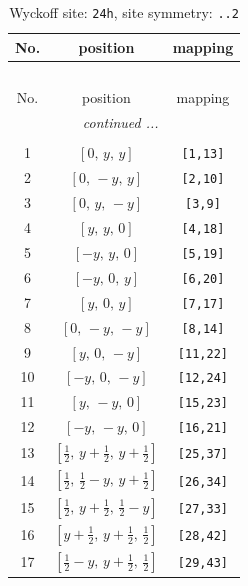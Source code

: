 \documentclass[fleqn,8pt]{jsarticle}
\begin{document}
\begin{longtable}{ccc}
\caption{Wyckoff site: {\tt 24h}, site symmetry: {\tt ..2}}
 \\
 \hline \hline
No. & position & mapping \\ \hline \endfirsthead

\multicolumn{2}{l}{\tablename\ \thetable{}} \\
 \hline \hline
No. & position & mapping \\ \hline \endhead

 \hline \hline
\multicolumn{2}{r}{\footnotesize\it continued ...} \\ \endfoot

 \hline \hline
\multicolumn{2}{r}{} \\ \endlastfoot

1 & $\left[ 0,\, y,\, y \right]$ & {\tt [1,13]} \\ \hline
2 & $\left[ 0,\, - y,\, y \right]$ & {\tt [2,10]} \\ \hline
3 & $\left[ 0,\, y,\, - y \right]$ & {\tt [3,9]} \\ \hline
4 & $\left[ y,\, y,\, 0 \right]$ & {\tt [4,18]} \\ \hline
5 & $\left[ - y,\, y,\, 0 \right]$ & {\tt [5,19]} \\ \hline
6 & $\left[ - y,\, 0,\, y \right]$ & {\tt [6,20]} \\ \hline
7 & $\left[ y,\, 0,\, y \right]$ & {\tt [7,17]} \\ \hline
8 & $\left[ 0,\, - y,\, - y \right]$ & {\tt [8,14]} \\ \hline
9 & $\left[ y,\, 0,\, - y \right]$ & {\tt [11,22]} \\ \hline
10 & $\left[ - y,\, 0,\, - y \right]$ & {\tt [12,24]} \\ \hline
11 & $\left[ y,\, - y,\, 0 \right]$ & {\tt [15,23]} \\ \hline
12 & $\left[ - y,\, - y,\, 0 \right]$ & {\tt [16,21]} \\ \hline
13 & $\left[ \frac{1}{2},\, y + \frac{1}{2},\, y + \frac{1}{2} \right]$ & {\tt [25,37]} \\ \hline
14 & $\left[ \frac{1}{2},\, \frac{1}{2} - y,\, y + \frac{1}{2} \right]$ & {\tt [26,34]} \\ \hline
15 & $\left[ \frac{1}{2},\, y + \frac{1}{2},\, \frac{1}{2} - y \right]$ & {\tt [27,33]} \\ \hline
16 & $\left[ y + \frac{1}{2},\, y + \frac{1}{2},\, \frac{1}{2} \right]$ & {\tt [28,42]} \\ \hline
17 & $\left[ \frac{1}{2} - y,\, y + \frac{1}{2},\, \frac{1}{2} \right]$ & {\tt [29,43]} \\ \hline

\end{longtable}
\end{document}
